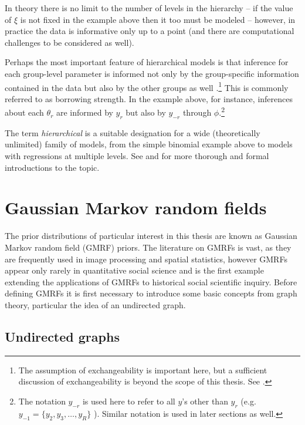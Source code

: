 In theory there is no limit to the number of levels in the hierarchy -- if the value of $\xi$ is not fixed in the example above then it too must be modeled -- however, in practice the data is informative only up to a point (and there are computational challenges to be considered as well). 

Perhaps the most important feature of hierarchical models is that inference for each group-level parameter is informed not only by the group-specific information contained in the data but also by the other groups as well .\footnote{The assumption of exchangeability is important here, but a sufficient discussion of exchangeability is beyond the scope of this thesis. See .} This is commonly referred to as borrowing strength. In the example above, for instance, inferences about each $\theta_r$ are informed by $y_r$ but also by $y_{-r}$ through $\phi$.\footnote{The notation $y_{-r}$ is used here to refer to all $y$'s other than $y_r$ (e.g. $y_{-1} =  \{y_2, y_3, \dots, y_R\}$ ). Similar notation is used in later sections as well. } 

The term {\it hierarchical} is a suitable designation for a wide (theoretically unlimited) family of models, from the simple binomial example above to models with regressions at multiple levels. See  and  for more thorough and formal introductions to the topic.  




\section{Gaussian Markov random fields}
\label{gmrf}

The prior distributions of particular interest in this thesis are known as Gaussian Markov random field (GMRF) priors. The literature on GMRFs is vast, as they are frequently used in image processing and spatial statistics, however  GMRFs appear only rarely in quantitative social science and  is the first example extending the applications of GMRFs to historical social scientific inquiry. Before defining GMRFs it is first necessary to introduce some basic concepts from graph theory, particular the idea of an undirected graph. 

\subsection{Undirected graphs}

